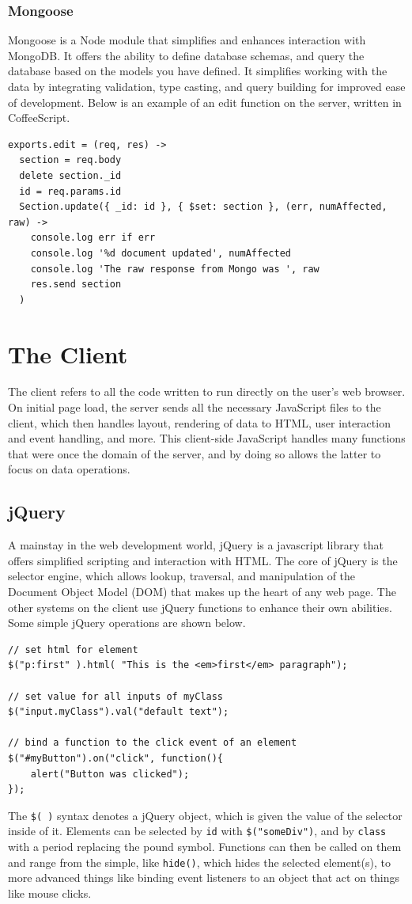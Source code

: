 \documentclass[12pt]{article}
\newcommand{\code}[1]{{\texttt {#1}}}
\begin{document}
\subsubsection{Mongoose}\label{sec:mongoose}
Mongoose\cite{Mongoose} is a Node module that simplifies and enhances interaction with MongoDB. It offers the ability to define database schemas, and query the database based on the models you have defined. It simplifies working with the data by integrating validation, type casting, and query building for improved ease of development. Below is an example of an edit function on the server, written in CoffeeScript.
\begin{verbatim}
exports.edit = (req, res) ->
  section = req.body
  delete section._id
  id = req.params.id
  Section.update({ _id: id }, { $set: section }, (err, numAffected, raw) ->
    console.log err if err
    console.log '%d document updated', numAffected
    console.log 'The raw response from Mongo was ', raw
    res.send section
  )
\end{verbatim}


\section{The Client}\label{sec:client}
The client refers to all the code written to run directly on the user's web browser. On initial page load, the server sends all the necessary JavaScript files to the client, which then handles layout, rendering of data to HTML, user interaction and event handling, and more. This client-side JavaScript handles many functions that were once the domain of the server, and by doing so allows the latter to focus on data operations.

\subsection{jQuery}\label{sec:jquery}
A mainstay in the web development world, jQuery\cite{jQuery} is a javascript library that offers simplified scripting and interaction with HTML. The core of jQuery is the selector engine, which allows lookup, traversal, and manipulation of the Document Object Model (DOM) that makes up the heart of any web page. The other systems on the client use jQuery functions to enhance their own abilities. Some simple jQuery operations are shown below.
\begin{verbatim}
// set html for element
$("p:first" ).html( "This is the <em>first</em> paragraph");

// set value for all inputs of myClass
$("input.myClass").val("default text");

// bind a function to the click event of an element
$("#myButton").on("click", function(){
    alert("Button was clicked");
});
\end{verbatim}
The \code{\$( )} syntax denotes a jQuery object, which is given the value of the selector inside of it. Elements can be selected by \code{id} with \code{\$("someDiv")}, and by \code{class} with a period replacing the pound symbol. Functions can then be called on them and range from the simple, like \code{hide()}, which hides the selected element(s), to more advanced things like binding event listeners to an object that act on things like mouse clicks.
\end{document}
